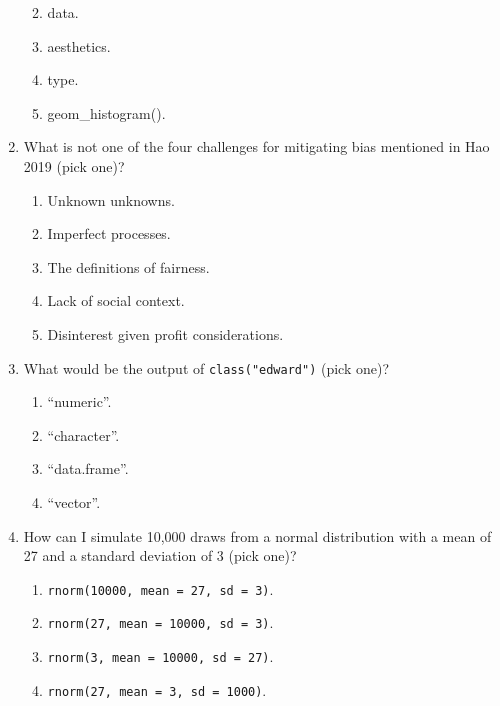 \documentclass[
]{book}
\providecommand{\tightlist}{%
  \setlength{\itemsep}{0pt}\setlength{\parskip}{0pt}}
\begin{document}
\begin{enumerate}
  \begin{enumerate}
  \def\labelenumii{\alph{enumii}.}
  \tightlist
  \item
    data.
  \item
    aesthetics.
  \item
    type.
  \item
    geom\_histogram().
  \end{enumerate}
\item
  What is not one of the four challenges for mitigating bias mentioned in Hao 2019 (pick one)?

  \begin{enumerate}
  \def\labelenumii{\alph{enumii}.}
  \tightlist
  \item
    Unknown unknowns.
  \item
    Imperfect processes.
  \item
    The definitions of fairness.
  \item
    Lack of social context.
  \item
    Disinterest given profit considerations.
  \end{enumerate}
\item
  What would be the output of \texttt{class("edward")} (pick one)?

  \begin{enumerate}
  \def\labelenumii{\alph{enumii}.}
  \tightlist
  \item
    ``numeric''.
  \item
    ``character''.
  \item
    ``data.frame''.
  \item
    ``vector''.
  \end{enumerate}
\item
  How can I simulate 10,000 draws from a normal distribution with a mean of 27 and a standard deviation of 3 (pick one)?

  \begin{enumerate}
  \def\labelenumii{\alph{enumii}.}
  \tightlist
  \item
    \texttt{rnorm(10000,\ mean\ =\ 27,\ sd\ =\ 3)}.
  \item
    \texttt{rnorm(27,\ mean\ =\ 10000,\ sd\ =\ 3)}.
  \item
    \texttt{rnorm(3,\ mean\ =\ 10000,\ sd\ =\ 27)}.
  \item
    \texttt{rnorm(27,\ mean\ =\ 3,\ sd\ =\ 1000)}.
  \end{enumerate}
\end{enumerate}
\end{document}
